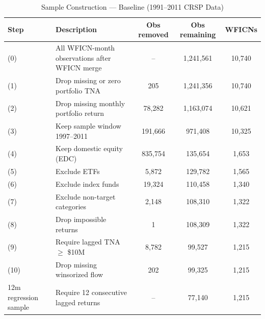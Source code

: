 \documentclass{article}
\begin{document}

\begin{table}[htbp]
\centering
\caption{Sample Construction --- Baseline (1991--2011 CRSP Data)}
\label{tab:sample-construction-baseline}
\small
\begin{tabularx}{\textwidth}{lXccc}
\toprule
Step & Description & Obs removed & Obs remaining & WFICNs \\
\midrule
(0) & All WFICN-month observations after WFICN merge & -- & 1,241,561 & 10,740 \\
(1) & Drop missing or zero portfolio TNA & 205 & 1,241,356 & 10,740 \\
(2) & Drop missing monthly portfolio return & 78,282 & 1,163,074 & 10,621 \\
(3) & Keep sample window 1997--2011 & 191,666 & 971,408 & 10,325 \\
(4) & Keep domestic equity (EDC) & 835,754 & 135,654 & 1,653 \\
(5) & Exclude ETFs & 5,872 & 129,782 & 1,565 \\
(6) & Exclude index funds & 19,324 & 110,458 & 1,340 \\
(7) & Exclude non-target categories & 2,148 & 108,310 & 1,322 \\
(8) & Drop impossible returns & 1 & 108,309 & 1,322 \\
(9) & Require lagged TNA $\geq$ \$10M & 8,782 & 99,527 & 1,215 \\
(10) & Drop missing winsorized flow & 202 & 99,325 & 1,215 \\
12m regression sample & Require 12 consecutive lagged returns & -- & 77,140 & 1,215 \\
\bottomrule
\end{tabularx}
\end{table}

\end{document}
